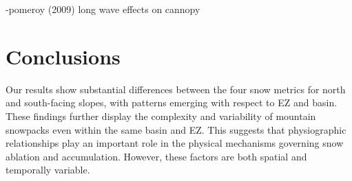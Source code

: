 -pomeroy (2009) long wave effects on cannopy

\hypertarget{ch2-conclusions}{\section{Conclusions}\label{ch2-conclusions}}

Our results show substantial differences between the four snow metrics for north and south-facing slopes, with patterns emerging with respect to EZ and basin. These findings further display the complexity and variability of mountain snowpacks even within the same basin and EZ. This suggests that physiographic relationships play an important role in the physical mechanisms governing snow ablation and accumulation. However, these factors are both spatial and temporally variable. 

\clearpage


